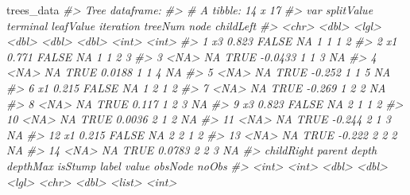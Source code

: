 \documentclass[
]{article}
\newenvironment{Shaded}{\begin{snugshade}}{\end{snugshade}}
\newcommand{\CommentTok}[1]{\textcolor[rgb]{0.56,0.35,0.01}{\textit{#1}}}
\newcommand{\NormalTok}[1]{#1}
\begin{document}
\begin{Shaded}
\begin{Highlighting}[]
\NormalTok{trees\_data}
\CommentTok{\#\textgreater{} Tree dataframe:}
\CommentTok{\#\textgreater{} \# A tibble: 14 x 17}
\CommentTok{\#\textgreater{}    var   splitValue terminal leafValue iteration treeNum  node childLeft}
\CommentTok{\#\textgreater{}    \textless{}chr\textgreater{}      \textless{}dbl\textgreater{} \textless{}lgl\textgreater{}        \textless{}dbl\textgreater{}     \textless{}dbl\textgreater{}   \textless{}dbl\textgreater{} \textless{}int\textgreater{}     \textless{}int\textgreater{}}
\CommentTok{\#\textgreater{}  1 x3         0.823 FALSE      NA              1       1     1         2}
\CommentTok{\#\textgreater{}  2 x1         0.771 FALSE      NA              1       1     2         3}
\CommentTok{\#\textgreater{}  3 \textless{}NA\textgreater{}      NA     TRUE       {-}0.0433         1       1     3        NA}
\CommentTok{\#\textgreater{}  4 \textless{}NA\textgreater{}      NA     TRUE        0.0188         1       1     4        NA}
\CommentTok{\#\textgreater{}  5 \textless{}NA\textgreater{}      NA     TRUE       {-}0.252          1       1     5        NA}
\CommentTok{\#\textgreater{}  6 x1         0.215 FALSE      NA              1       2     1         2}
\CommentTok{\#\textgreater{}  7 \textless{}NA\textgreater{}      NA     TRUE       {-}0.269          1       2     2        NA}
\CommentTok{\#\textgreater{}  8 \textless{}NA\textgreater{}      NA     TRUE        0.117          1       2     3        NA}
\CommentTok{\#\textgreater{}  9 x3         0.823 FALSE      NA              2       1     1         2}
\CommentTok{\#\textgreater{} 10 \textless{}NA\textgreater{}      NA     TRUE        0.0036         2       1     2        NA}
\CommentTok{\#\textgreater{} 11 \textless{}NA\textgreater{}      NA     TRUE       {-}0.244          2       1     3        NA}
\CommentTok{\#\textgreater{} 12 x1         0.215 FALSE      NA              2       2     1         2}
\CommentTok{\#\textgreater{} 13 \textless{}NA\textgreater{}      NA     TRUE       {-}0.222          2       2     2        NA}
\CommentTok{\#\textgreater{} 14 \textless{}NA\textgreater{}      NA     TRUE        0.0783         2       2     3        NA}
\CommentTok{\#\textgreater{}    childRight parent depth depthMax isStump label         value obsNode    noObs}
\CommentTok{\#\textgreater{}         \textless{}int\textgreater{}  \textless{}int\textgreater{} \textless{}dbl\textgreater{}    \textless{}dbl\textgreater{} \textless{}lgl\textgreater{}   \textless{}chr\textgreater{}         \textless{}dbl\textgreater{} \textless{}list\textgreater{}     \textless{}int\textgreater{}}

\end{Highlighting}
\end{Shaded}
\end{document}
